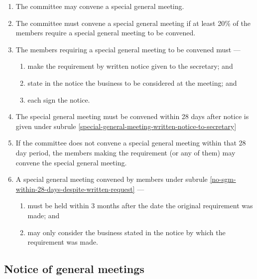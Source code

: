 \documentclass[../constitution.tex]{subfiles}
\begin{document}
\begin{enumerate}

  \item The committee may convene a special general meeting.
  \item The committee must convene a special general meeting if at least 20\% of the members require a special general meeting to be convened.
  \item The members requiring a special general meeting to be convened must ---

        \begin{enumerate}

          \item make the requirement by written notice given to the secretary; and \label{special-general-meeting-written-notice-to-secretary}
          \item state in the notice the business to be considered at the meeting; and
          \item each sign the notice.
        \end{enumerate}
  \item The special general meeting must be convened within 28 days after notice is given under subrule \ref{special-general-meeting-written-notice-to-secretary}
  \item If the committee does not convene a special general meeting within that 28 day period, the members making the requirement (or any of them) may convene the special general meeting. \label{no-sgm-within-28-days-despite-written-request}
  \item A special general meeting convened by members under subrule \ref{no-sgm-within-28-days-despite-written-request} ---

        \begin{enumerate}

          \item must be held within 3 months after the date the original requirement was made; and
          \item may only consider the business stated in the notice by which the requirement was made.
        \end{enumerate}
\end{enumerate}

\hypertarget{notice-of-general-meetings}{%
  \subsection{Notice of general meetings}\label{notice-of-general-meetings}}
\end{document}
